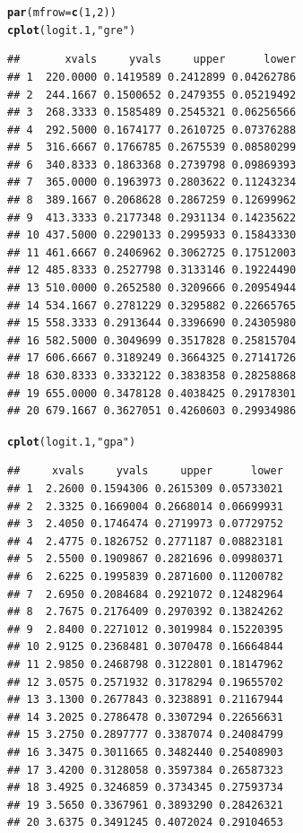 \documentclass[onesided]{article}\usepackage[]{graphicx}\usepackage[]{color}
\makeatletter
\newcommand{\hlnum}[1]{\textcolor[rgb]{0.686,0.059,0.569}{#1}}%
\newcommand{\hlstr}[1]{\textcolor[rgb]{0.192,0.494,0.8}{#1}}%
\newcommand{\hlstd}[1]{\textcolor[rgb]{0.345,0.345,0.345}{#1}}%
\newcommand{\hlkwc}[1]{\textcolor[rgb]{0.333,0.667,0.333}{#1}}%
\newcommand{\hlkwd}[1]{\textcolor[rgb]{0.737,0.353,0.396}{\textbf{#1}}}%
\newenvironment{kframe}{%
 \def\at@end@of@kframe{}%
 \ifinner\ifhmode%
  \def\at@end@of@kframe{\end{minipage}}%
  \begin{minipage}{\columnwidth}%
 \fi\fi%
 \def\FrameCommand##1{\hskip\@totalleftmargin \hskip-\fboxsep
 \colorbox{shadecolor}{##1}\hskip-\fboxsep
     \hskip-\linewidth \hskip-\@totalleftmargin \hskip\columnwidth}%
 \MakeFramed {\advance\hsize-\width
   \@totalleftmargin\z@ \linewidth\hsize
   \@setminipage}}%
 {\par\unskip\endMakeFramed%
 \at@end@of@kframe}
\newenvironment{knitrout}{}{} %
\makeatother
\begin{document}
\begin{knitrout}
\color{fgcolor}\begin{kframe}
\begin{alltt}
\hlkwd{par}\hlstd{(}\hlkwc{mfrow}\hlstd{=}\hlkwd{c}\hlstd{(}\hlnum{1}\hlstd{,}\hlnum{2}\hlstd{))}
\hlkwd{cplot}\hlstd{(logit.1,} \hlstr{"gre"}\hlstd{)}
\end{alltt}
\begin{verbatim}
##       xvals     yvals     upper      lower
## 1  220.0000 0.1419589 0.2412899 0.04262786
## 2  244.1667 0.1500652 0.2479355 0.05219492
## 3  268.3333 0.1585489 0.2545321 0.06256566
## 4  292.5000 0.1674177 0.2610725 0.07376288
## 5  316.6667 0.1766785 0.2675539 0.08580299
## 6  340.8333 0.1863368 0.2739798 0.09869393
## 7  365.0000 0.1963973 0.2803622 0.11243234
## 8  389.1667 0.2068628 0.2867259 0.12699962
## 9  413.3333 0.2177348 0.2931134 0.14235622
## 10 437.5000 0.2290133 0.2995933 0.15843330
## 11 461.6667 0.2406962 0.3062725 0.17512003
## 12 485.8333 0.2527798 0.3133146 0.19224490
## 13 510.0000 0.2652580 0.3209666 0.20954944
## 14 534.1667 0.2781229 0.3295882 0.22665765
## 15 558.3333 0.2913644 0.3396690 0.24305980
## 16 582.5000 0.3049699 0.3517828 0.25815704
## 17 606.6667 0.3189249 0.3664325 0.27141726
## 18 630.8333 0.3332122 0.3838358 0.28258868
## 19 655.0000 0.3478128 0.4038425 0.29178301
## 20 679.1667 0.3627051 0.4260603 0.29934986
\end{verbatim}
\begin{alltt}
\hlkwd{cplot}\hlstd{(logit.1,} \hlstr{"gpa"}\hlstd{)}
\end{alltt}
\begin{verbatim}
##     xvals     yvals     upper      lower
## 1  2.2600 0.1594306 0.2615309 0.05733021
## 2  2.3325 0.1669004 0.2668014 0.06699931
## 3  2.4050 0.1746474 0.2719973 0.07729752
## 4  2.4775 0.1826752 0.2771187 0.08823181
## 5  2.5500 0.1909867 0.2821696 0.09980371
## 6  2.6225 0.1995839 0.2871600 0.11200782
## 7  2.6950 0.2084684 0.2921072 0.12482964
## 8  2.7675 0.2176409 0.2970392 0.13824262
## 9  2.8400 0.2271012 0.3019984 0.15220395
## 10 2.9125 0.2368481 0.3070478 0.16664844
## 11 2.9850 0.2468798 0.3122801 0.18147962
## 12 3.0575 0.2571932 0.3178294 0.19655702
## 13 3.1300 0.2677843 0.3238891 0.21167944
## 14 3.2025 0.2786478 0.3307294 0.22656631
## 15 3.2750 0.2897777 0.3387074 0.24084799
## 16 3.3475 0.3011665 0.3482440 0.25408903
## 17 3.4200 0.3128058 0.3597384 0.26587323
## 18 3.4925 0.3246859 0.3734345 0.27593734
## 19 3.5650 0.3367961 0.3893290 0.28426321
## 20 3.6375 0.3491245 0.4072024 0.29104653
\end{verbatim}
\end{kframe}


\end{knitrout}
\end{document}
